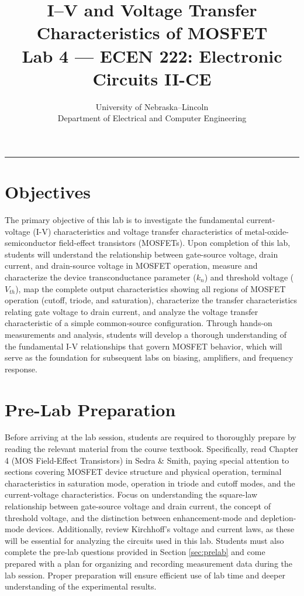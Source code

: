 \documentclass[10pt]{article}
\title{\textbf{\Huge I–V and Voltage Transfer Characteristics of MOSFET}\\
\large Lab 4 — ECEN 222: Electronic Circuits II-CE}
\author{
\large University of Nebraska–Lincoln \\
\large Department of Electrical and Computer Engineering
}
\date{} %
\begin{document}
\thispagestyle{fancy}
\maketitle
\rule{\textwidth}{0.5pt}


\section{Objectives}

The primary objective of this lab is to investigate the fundamental current-voltage (I-V) characteristics and voltage transfer characteristics of metal-oxide-semiconductor field-effect transistors (MOSFETs). Upon completion of this lab, students will understand the relationship between gate-source voltage, drain current, and drain-source voltage in MOSFET operation, measure and characterize the device transconductance parameter ($k_n$) and threshold voltage ($V_{th}$), map the complete output characteristics showing all regions of MOSFET operation (cutoff, triode, and saturation), characterize the transfer characteristics relating gate voltage to drain current, and analyze the voltage transfer characteristic of a simple common-source configuration.  Through hands-on measurements and analysis, students will develop a thorough understanding of the fundamental I-V relationships that govern MOSFET behavior, which will serve as the foundation for subsequent labs on biasing, amplifiers, and frequency response.

\section{Pre-Lab Preparation}

Before arriving at the lab session, students are required to thoroughly prepare by reading the relevant material from the course textbook.  Specifically, read Chapter 4 (MOS Field-Effect Transistors) in Sedra \& Smith, paying special attention to sections covering MOSFET device structure and physical operation, terminal characteristics in saturation mode, operation in triode and cutoff modes, and the current-voltage characteristics. Focus on understanding the square-law relationship between gate-source voltage and drain current, the concept of threshold voltage, and the distinction between enhancement-mode and depletion-mode devices. Additionally, review Kirchhoff's voltage and current laws, as these will be essential for analyzing the circuits used in this lab.  Students must also complete the pre-lab questions provided in Section \ref{sec:prelab} and come prepared with a plan for organizing and recording measurement data during the lab session.  Proper preparation will ensure efficient use of lab time and deeper understanding of the experimental results.
\end{document}

